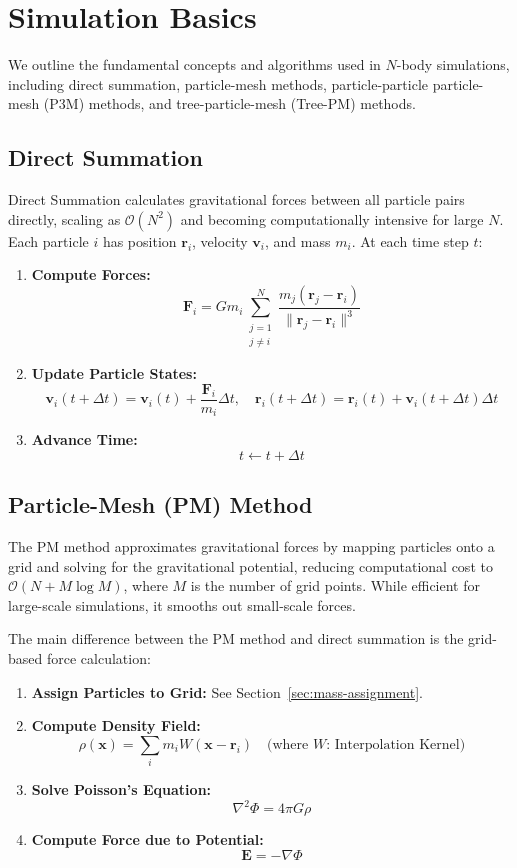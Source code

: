 \section{Simulation Basics}
We outline the fundamental concepts and algorithms used in $N$-body simulations, including direct summation, particle-mesh methods, particle-particle particle-mesh (P3M) methods, and tree-particle-mesh (Tree-PM) methods.

\subsection{Direct Summation}
Direct Summation calculates gravitational forces between all particle pairs directly, scaling as $\mathcal{O}(N^2)$ and becoming computationally intensive for large $N$. Each particle $i$ has position $\mathbf{r}_i$, velocity $\mathbf{v}_i$, and mass $m_i$. At each time step $t$:
\begin{enumerate}
    \item \textbf{Compute Forces:}
    \[
    \mathbf{F}_i = G m_i \sum_{\substack{j=1 \\ j \neq i}}^{N} \frac{m_j (\mathbf{r}_j - \mathbf{r}_i)}{\|\mathbf{r}_j - \mathbf{r}_i\|^3}
    \]
    
    \item \textbf{Update Particle States:}
    \[
    \mathbf{v}_i(t + \Delta t) = \mathbf{v}_i(t) + \frac{\mathbf{F}_i}{m_i} \Delta t, \quad \mathbf{r}_i(t + \Delta t) = \mathbf{r}_i(t) + \mathbf{v}_i(t + \Delta t) \Delta t
    \]
    
    \item \textbf{Advance Time:}
    \[
    t \leftarrow t + \Delta t
    \]
\end{enumerate}

\subsection{Particle-Mesh (PM) Method}
The PM method approximates gravitational forces by mapping particles onto a grid and solving for the gravitational potential, reducing computational cost to $\mathcal{O}(N + M \log M)$, where $M$ is the number of grid points. While efficient for large-scale simulations, it smooths out small-scale forces.

The main difference between the PM method and direct summation is the grid-based force calculation:
\begin{enumerate}
    \item \textbf{Assign Particles to Grid:} See Section~\ref{sec:mass-assignment}.
    \item \textbf{Compute Density Field:}
    \[
    \rho(\mathbf{x}) = \sum_i m_i W(\mathbf{x} - \mathbf{r}_i) \quad \text{(where $W$: Interpolation Kernel)}
    \]
    \item \textbf{Solve Poisson's Equation:}
    \[
    \nabla^2 \Phi = 4\pi G \rho
    \]
    \item \textbf{Compute Force due to Potential:}
    \[
    \mathbf{E} = -\nabla \Phi
    \]
\end{enumerate}

